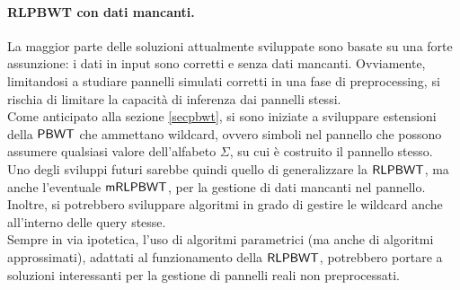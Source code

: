 \paragraph{RLPBWT con dati mancanti.}
La maggior parte delle soluzioni attualmente sviluppate sono basate su una forte
assunzione: i dati in input sono corretti e senza dati mancanti. Ovviamente,
limitandosi a studiare pannelli simulati corretti in una fase di
preprocessing, si rischia di limitare la capacità di inferenza dai pannelli
stessi.\\ 
Come anticipato alla sezione \ref{secpbwt}, si sono iniziate a sviluppare
estensioni della $\mbox{\rm {\sf PBWT}}$ che ammettano wildcard, ovvero simboli nel
pannello che possono assumere qualsiasi valore dell'alfabeto $\Sigma$, su cui è
costruito il pannello stesso.\\
Uno degli sviluppi futuri sarebbe quindi quello di generalizzare la
$\mbox{\rm {\sf RLPBWT}}$, ma anche l'eventuale $\mbox{\rm {\sf mRLPBWT}}$, per la gestione di dati
mancanti nel pannello. Inoltre, si potrebbero sviluppare algoritmi in grado di
gestire le wildcard anche all'interno delle query stesse.\\
Sempre in via ipotetica, l'uso di algoritmi parametrici (ma anche
di algoritmi approssimati), adattati al
funzionamento della $\mbox{\rm {\sf RLPBWT}}$, potrebbero portare a soluzioni interessanti
per la gestione di pannelli reali non preprocessati.

